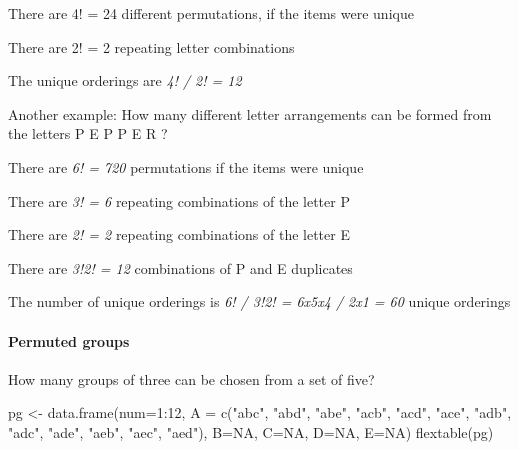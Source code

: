 \documentclass[
  letterpaper,
  DIV=11,
  numbers=noendperiod,
  oneside]{scrartcl}
\let\oldparagraph\paragraph
\renewcommand{\paragraph}[1]{\oldparagraph{#1}\mbox{}}
\newenvironment{Shaded}{\begin{snugshade}}{\end{snugshade}}
\newcommand{\AttributeTok}[1]{\textcolor[rgb]{0.40,0.45,0.13}{#1}}
\newcommand{\ConstantTok}[1]{\textcolor[rgb]{0.56,0.35,0.01}{#1}}
\newcommand{\DecValTok}[1]{\textcolor[rgb]{0.68,0.00,0.00}{#1}}
\newcommand{\FunctionTok}[1]{\textcolor[rgb]{0.28,0.35,0.67}{#1}}
\newcommand{\NormalTok}[1]{\textcolor[rgb]{0.00,0.23,0.31}{#1}}
\newcommand{\OtherTok}[1]{\textcolor[rgb]{0.00,0.23,0.31}{#1}}
\newcommand{\SpecialCharTok}[1]{\textcolor[rgb]{0.37,0.37,0.37}{#1}}
\newcommand{\StringTok}[1]{\textcolor[rgb]{0.13,0.47,0.30}{#1}}
\begin{document}
There are 4! = 24 different permutations, if the items were unique

There are 2! = 2 repeating letter combinations

The unique orderings are \emph{4! / 2! = 12}

Another example: How many different letter arrangements can be formed
from the letters P E P P E R ?

There are \emph{6! = 720} permutations if the items were unique

There are \emph{3! = 6} repeating combinations of the letter P

There are \emph{2! = 2} repeating combinations of the letter E

There are \emph{3!2! = 12} combinations of P and E duplicates

The number of unique orderings is \emph{6! / 3!2! = 6x5x4 / 2x1 = 60}
unique orderings

\hypertarget{permuted-groups}{%
\paragraph{Permuted groups}\label{permuted-groups}}

How many groups of three can be chosen from a set of five?

\begin{Shaded}
\begin{Highlighting}[]
\NormalTok{pg }\OtherTok{\textless{}{-}} \FunctionTok{data.frame}\NormalTok{(}\AttributeTok{num=}\DecValTok{1}\SpecialCharTok{:}\DecValTok{12}\NormalTok{,}
                 \AttributeTok{A =} \FunctionTok{c}\NormalTok{(}\StringTok{"abc"}\NormalTok{,}
                       \StringTok{"abd"}\NormalTok{,}
                       \StringTok{"abe"}\NormalTok{,}
                       \StringTok{"acb"}\NormalTok{,}
                       \StringTok{"acd"}\NormalTok{,}
                       \StringTok{"ace"}\NormalTok{,}
                       \StringTok{"adb"}\NormalTok{,}
                       \StringTok{"adc"}\NormalTok{,}
                       \StringTok{"ade"}\NormalTok{,}
                       \StringTok{"aeb"}\NormalTok{,}
                       \StringTok{"aec"}\NormalTok{,}
                       \StringTok{"aed"}\NormalTok{),}
                 \AttributeTok{B=}\ConstantTok{NA}\NormalTok{, }\AttributeTok{C=}\ConstantTok{NA}\NormalTok{, }\AttributeTok{D=}\ConstantTok{NA}\NormalTok{, }\AttributeTok{E=}\ConstantTok{NA}\NormalTok{)}
\FunctionTok{flextable}\NormalTok{(pg)}
\end{Highlighting}
\end{Shaded}
\end{document}
